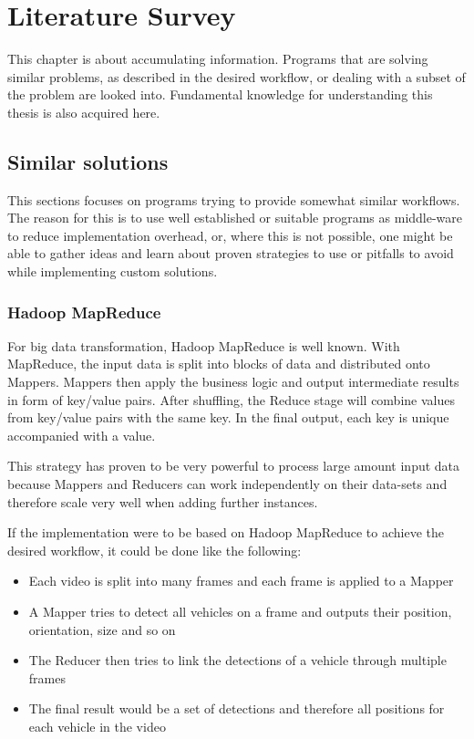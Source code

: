 \chapter{Literature Survey}
\label{state_of_the_art}

This chapter is about accumulating information.
Programs that are solving similar problems, as described in the desired workflow, or dealing with a subset of the problem are looked into.
Fundamental knowledge for understanding this thesis is also acquired here.
\section{Similar solutions}

This sections focuses on programs trying to provide somewhat similar workflows.
The reason for this is to use well established or suitable programs as middle-ware to reduce implementation overhead, or, where this is not possible, one might be able to gather ideas and learn about proven strategies to use or pitfalls to avoid while implementing custom solutions.


\subsection{Hadoop MapReduce}
\label{hadoop}
\label{hadoopfs}
\label{mapreduce}

For big data transformation, Hadoop MapReduce\cite{hdfs:main} is well known.
With MapReduce, the input data is split into blocks of data and distributed onto Mappers.
Mappers then apply the business logic and output intermediate results in form of key/value pairs.
After shuffling, the Reduce stage will combine values from key/value pairs with the same key.
In the final output, each key is unique accompanied with a value.

This strategy has proven to be very powerful to process large amount input data because Mappers and Reducers can work independently on their data-sets and therefore scale very well when adding further instances.

If the implementation were to be based on Hadoop MapReduce to achieve the desired workflow, it could be done like the following:
\begin{itemize}
	\item Each video is split into many frames and each frame is applied to a Mapper
	\item A Mapper tries to detect all vehicles on a frame and outputs their position, orientation, size and so on
	\item The Reducer then tries to link the detections of a vehicle through multiple frames
	\item The final result would be a set of detections and therefore all positions for each vehicle in the video
\end{itemize}

